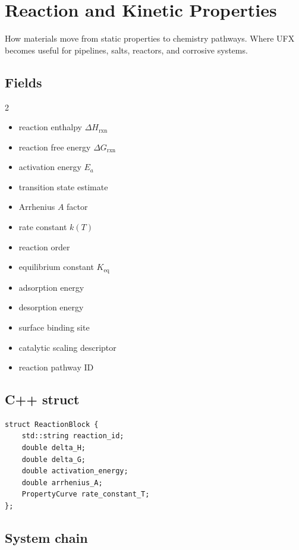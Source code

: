 \documentclass[11pt, a4paper]{article}
\begin{document}
\section{Reaction and Kinetic Properties}

How materials move from static properties to chemistry pathways. Where UFX becomes useful for pipelines, salts, reactors, and corrosive systems.

\subsection{Fields}

\begin{multicols}{2}
\begin{itemize}[itemsep=1pt, leftmargin=*]
  \item reaction enthalpy $\Delta H_\text{rxn}$
  \item reaction free energy $\Delta G_\text{rxn}$
  \item activation energy $E_a$
  \item transition state estimate
  \item Arrhenius $A$ factor
  \item rate constant $k(T)$
  \item reaction order
  \item equilibrium constant $K_\text{eq}$
  \item adsorption energy
  \item desorption energy
  \item surface binding site
  \item catalytic scaling descriptor
  \item reaction pathway ID
\end{itemize}
\end{multicols}

\subsection{C++ struct}

\begin{lstlisting}
struct ReactionBlock {
    std::string reaction_id;
    double delta_H;
    double delta_G;
    double activation_energy;
    double arrhenius_A;
    PropertyCurve rate_constant_T;
};
\end{lstlisting}

\subsection{System chain}
\end{document}
